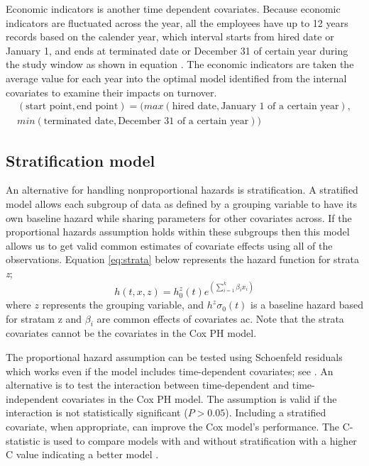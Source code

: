 \documentclass[12pt,letterpaper]{article}
\begin{document}
Economic indicators is another time dependent covariates. Because economic indicators are fluctuated across the year, all the employees have up to 12 years records based on the calender year, which interval starts from hired date or January 1, and ends at terminated date or December 31 of certain year during the study window as shown in equation . The economic indicators are taken the average value for each year into the optimal model identified from the internal covariates to examine their impacts on turnover.
\begin{equation}
\label{eq:interval}
\begin{split}
(\text{start point}, \text{end point})= (max(\text{hired date}, \text{January 1 of a certain year}),\\
                                        min(\text{terminated date}, \text{December 31 of a certain year}))
\end{split}
\end{equation}

\subsection{Stratification model}
An alternative for handling nonproportional hazards is stratification.  A stratified model allows each subgroup of data as defined by a grouping variable to have its own baseline hazard while sharing parameters for other covariates across. If the proportional hazards assumption holds within these subgroups then this model allows us to get valid common estimates of covariate effects using all of the observations. Equation \ref{eq:strata} below represents the hazard function for strata {\it z};
\begin{equation}
	\label{eq:strata}
	h(t,x,z)=h^z_0(t)e^{(\sum_{i=1}^{k}\beta_ix_i)}
\end{equation}
where $z$ represents the grouping variable, and $h^z\sigma_0(t)$ is a baseline hazard based for stratam z and $\beta_i$ are common effects of covariates ac. Note that the strata covariates cannot be the covariates in the Cox PH model.

The proportional hazard assumption can be tested using Schoenfeld residuals which works even if the model includes time-dependent covariates; see \citet{allison2010,collett2015}. An alternative is to test the interaction between time-dependent and time-independent covariates in the Cox PH model. The assumption is valid if the interaction is not statistically significant ($P>0.05$).  Including a stratified covariate, when appropriate, can improve the Cox model's performance.  The C-statistic is used to compare models with and without stratification with a higher C value indicating a better model \citep{lemke2012}.
\end{document}
